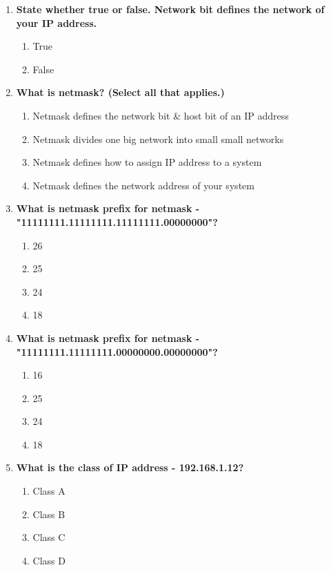 \begin{flushleft}
\begin{enumerate}
		\item \textbf{State whether true or false. Network bit defines the network of your IP address.}
		\begin{enumerate}[label=(\alph*)]
			\item True  %
			\item False
		\end{enumerate}
		\bigskip
		\bigskip	
		\newpage
		\item \textbf{What is netmask? (Select all that applies.)}
		\begin{enumerate}[label=(\alph*)]
			\item Netmask defines the network bit \& host bit of an IP address %
			\item Netmask divides one big network into small small networks %
			\item Netmask defines how to assign IP address to a system
			\item Netmask defines the network address of your system
		\end{enumerate}
		\bigskip
		\bigskip		
		

		\item \textbf{What is netmask prefix for netmask - "11111111.11111111.11111111.00000000"?}
		\begin{enumerate}[label=(\alph*)]
			\item 26
			\item 25
			\item 24  %
			\item 18
		\end{enumerate}
		\bigskip
		\bigskip

		\item \textbf{What is netmask prefix for netmask - "11111111.11111111.00000000.00000000"?}
		\begin{enumerate}[label=(\alph*)]
			\item 16  %
			\item 25
			\item 24  
			\item 18
		\end{enumerate}
		\bigskip
		\bigskip

		\item \textbf{What is the class of IP address - 192.168.1.12?}
		\begin{enumerate}[label=(\alph*)]
			\item Class A
			\item Class B
			\item Class C  %
			\item Class D
		\end{enumerate}
		\bigskip
		\bigskip


\end{enumerate}
\end{flushleft}
